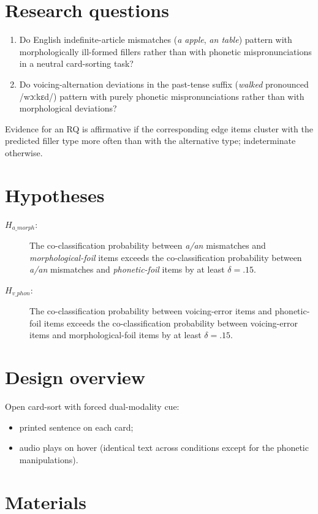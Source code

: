 \documentclass[12pt]{article}
\begin{document}
\section{Research questions}
\begin{enumerate}
\item Do English indefinite-article mismatches (\textit{a apple}, \textit{an table}) pattern with morphologically ill-formed fillers rather than with phonetic mispronunciations in a neutral card-sorting task?
\item Do voicing-alternation deviations in the past-tense suffix (\textit{walked} pronounced /wɔːkɛd/) pattern with purely phonetic mispronunciations rather than with morphological deviations?
\end{enumerate}
Evidence for an RQ is affirmative if the corresponding edge items cluster with the predicted filler type more often than with the alternative type; indeterminate otherwise.

\section{Hypotheses}
\begin{description}
\item[$H_{a\_morph}$:] The co-classification probability between \textit{a/an} mismatches and \textit{morphological-foil} items exceeds the co-classification probability between \textit{a/an} mismatches and \textit{phonetic-foil} items by at least $\delta = .15$.
\item[$H_{v\_phon}$:] The co-classification probability between voicing-error items and phonetic-foil items exceeds the co-classification probability between voicing-error items and morphological-foil items by at least $\delta = .15$.
\end{description}

\section{Design overview}
Open card-sort with forced dual-modality cue:
\begin{itemize}
\item printed sentence on each card;
\item audio plays on hover (identical text across conditions except for the phonetic manipulations).
\end{itemize}

\section{Materials}
\end{document}
